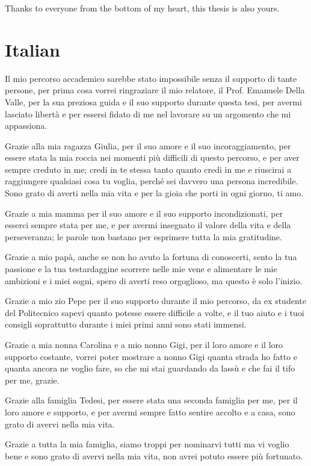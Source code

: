 \documentclass{Configuration_Files/PoliMi3i_thesis}
\begin{document}
Thanks to everyone from the bottom of my heart, this thesis is also yours.


\section{Italian}

Il mio percorso accademico sarebbe stato impossibile senza il supporto di tante persone, per prima cosa vorrei ringraziare il mio relatore, il Prof. Emanuele Della Valle,
per la sua preziosa guida e il suo supporto durante questa tesi, per avermi lasciato libertà e per essersi fidato di me nel lavorare su un argomento che mi appassiona.

Grazie alla mia ragazza Giulia, per il suo amore e il suo incoraggiamento, per essere stata la mia roccia nei momenti più difficili di questo percorso, e per aver sempre creduto in me; 
credi in te stessa tanto quanto credi in me e riuscirai a raggiungere qualsiasi cosa tu voglia, perché sei davvero una persona incredibile. Sono grato di averti nella mia vita e per la
gioia che porti in ogni giorno, ti amo.

Grazie a mia mamma per il suo amore e il suo supporto incondizionati, per esserci sempre stata per me, e per avermi insegnato il valore della vita e della perseveranza; le parole 
non bastano per esprimere tutta la mia gratitudine.

Grazie a mio papà, anche se non ho avuto la fortuna di conoscerti, sento la tua passione e la tua testardaggine scorrere nelle mie vene e alimentare le mie ambizioni e i miei sogni,
spero di averti reso orgoglioso, ma questo è solo l'inizio.

Grazie a mio zio Pepe per il suo supporto durante il mio percorso, da ex studente del Politecnico sapevi quanto potesse essere difficile a volte, e il tuo aiuto e i tuoi consigli 
soprattutto durante i miei primi anni sono stati immensi.

Grazie a mia nonna Carolina e a mio nonno Gigi, per il loro amore e il loro supporto costante, vorrei poter mostrare a nonno Gigi quanta strada ho fatto e quanta ancora
ne voglio fare, so che mi stai guardando da lassù e che fai il tifo per me, grazie.

Grazie alla famiglia Tedesi, per essere stata una seconda famiglia per me, per il loro amore e supporto, e per avermi sempre fatto sentire accolto e a casa, sono grato di avervi nella 
mia vita.

Grazie a tutta la mia famiglia, siamo troppi per nominarvi tutti ma vi voglio bene e sono grato di avervi nella mia vita, non avrei potuto essere più fortunato.
\end{document}
